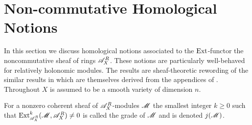 \section{Non-commutative Homological Notions}
In this section we discuss homological notions associated to the $\operatorname{Ext}$-functor the noncommutative sheaf of rings $\mathscr{A}_X^R$. These notions are particularly well-behaved for relatively holonomic modules.
The results are sheaf-theoretic rewording of the similar results in \cite{budur2019zero} which are themselves derived  from the appendices of \cite{bjork1993analytic}.
Throughout $X$ is assumed to be a smooth variety of dimension $n$.
\begin{definition}
  For a nonzero coherent sheaf of $\mathscr{A}_X^R$-modules $\mathscr{M}$ the smallest integer $k\geq 0$ such that $\Ex{\A_X^R}{k}(\M,\A_X^R)\neq 0$ is called the grade of $\mathscr{M}$ and is denoted $j(\mathscr{M})$.
\end{definition}


